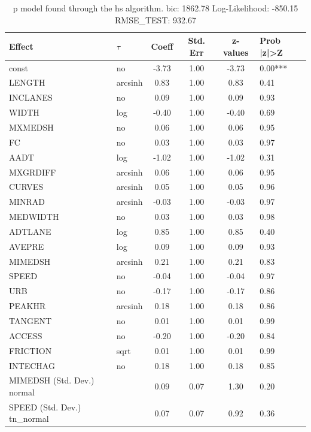 \begin{table}
	\caption{p model found through the hs algorithm. bic: 1862.78 Log-Likelihood: -850.15 RMSE_TEST: 932.67}
	\begin{center}
		\begin{tabular}{|l|l|c|c|c|l|}
			\hline
			Effect & $\tau$ & Coeff & Std. Err & z-values & Prob |z|>Z \\
			\hline
			const & no & -3.73 & 1.00 & -3.73 & 0.00*** \\
			\hline
			LENGTH & arcsinh & 0.83 & 1.00 & 0.83 & 0.41 \\
			\hline
			INCLANES & no & 0.09 & 1.00 & 0.09 & 0.93 \\
			\hline
			WIDTH & log & -0.40 & 1.00 & -0.40 & 0.69 \\
			\hline
			MXMEDSH & no & 0.06 & 1.00 & 0.06 & 0.95 \\
			\hline
			FC & no & 0.03 & 1.00 & 0.03 & 0.97 \\
			\hline
			AADT & log & -1.02 & 1.00 & -1.02 & 0.31 \\
			\hline
			MXGRDIFF & arcsinh & 0.06 & 1.00 & 0.06 & 0.95 \\
			\hline
			CURVES & arcsinh & 0.05 & 1.00 & 0.05 & 0.96 \\
			\hline
			MINRAD & arcsinh & -0.03 & 1.00 & -0.03 & 0.97 \\
			\hline
			MEDWIDTH & no & 0.03 & 1.00 & 0.03 & 0.98 \\
			\hline
			ADTLANE & log & 0.85 & 1.00 & 0.85 & 0.40 \\
			\hline
			AVEPRE & log & 0.09 & 1.00 & 0.09 & 0.93 \\
			\hline
			MIMEDSH & arcsinh & 0.21 & 1.00 & 0.21 & 0.83 \\
			\hline
			SPEED & no & -0.04 & 1.00 & -0.04 & 0.97 \\
			\hline
			URB & no & -0.17 & 1.00 & -0.17 & 0.86 \\
			\hline
			PEAKHR & arcsinh & 0.18 & 1.00 & 0.18 & 0.86 \\
			\hline
			TANGENT & no & 0.01 & 1.00 & 0.01 & 0.99 \\
			\hline
			ACCESS & no & -0.20 & 1.00 & -0.20 & 0.84 \\
			\hline
			FRICTION & sqrt & 0.01 & 1.00 & 0.01 & 0.99 \\
			\hline
			INTECHAG & no & 0.18 & 1.00 & 0.18 & 0.85 \\
			\hline
			MIMEDSH (Std. Dev.) normal &  & 0.09 & 0.07 & 1.30 & 0.20 \\
			\hline
			SPEED (Std. Dev.) tn_normal &  & 0.07 & 0.07 & 0.92 & 0.36 \\

\end{tabular}
\end{center}
\end{table}
